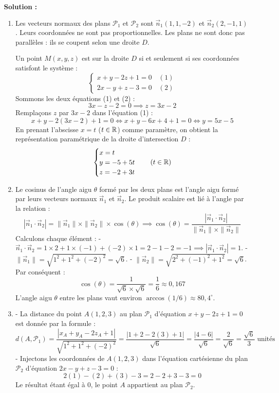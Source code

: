 \textbf{Solution :}
\begin{enumerate}
    \item Les vecteurs normaux des plans $\mathcal{P}_1$ et $\mathcal{P}_2$ sont $\vec{n}_1(1, 1, -2)$ et $\vec{n}_2(2, -1, 1)$.
    Leurs coordonnées ne sont pas proportionnelles. Les plans ne sont donc pas parallèles : ils se coupent selon une droite $D$.
    
    Un point $M(x,y,z)$ est sur la droite $D$ si et seulement si ses coordonnées satisfont le système :
    \[
    \begin{cases}
    x + y - 2z + 1 = 0 \quad (1) \\
    2x - y + z - 3 = 0 \quad (2)
    \end{cases}
    \]
    Sommons les deux équations (1) et (2) :
    \[
    3x - z - 2 = 0 \implies z = 3x - 2
    \]
    Remplaçons $z$ par $3x - 2$ dans l'équation (1) :
    \[
    x + y - 2(3x - 2) + 1 = 0 \iff x + y - 6x + 4 + 1 = 0 \iff y = 5x - 5
    \]
    En prenant l'abscisse $x = t$ ($t \in \mathbb{R}$) comme paramètre, on obtient la représentation paramétrique de la droite d'intersection $D$ :
    \[
    \begin{cases}
    x = t \\
    y = -5 + 5t \\
    z = -2 + 3t
    \end{cases} \quad (t \in \mathbb{R})
    \]
    
    \item Le cosinus de l'angle aigu $\theta$ formé par les deux plans est l'angle aigu formé par leurs vecteurs normaux $\vec{n}_1$ et $\vec{n}_2$. Le produit scalaire est lié à l'angle par la relation :
    \[
    |\vec{n}_1 \cdot \vec{n}_2| = \|\vec{n}_1\| \times \|\vec{n}_2\| \times \cos(\theta) \implies \cos(\theta) = \frac{|\vec{n}_1 \cdot \vec{n}_2|}{\|\vec{n}_1\| \times \|\vec{n}_2\|}
    \]
    Calculons chaque élément :
    - $\vec{n}_1 \cdot \vec{n}_2 = 1 \times 2 + 1 \times (-1) + (-2) \times 1 = 2 - 1 - 2 = -1 \implies |\vec{n}_1 \cdot \vec{n}_2| = 1$.
    - $\|\vec{n}_1\| = \sqrt{1^2 + 1^2 + (-2)^2} = \sqrt{6}$.
    - $\|\vec{n}_2\| = \sqrt{2^2 + (-1)^2 + 1^2} = \sqrt{6}$.
    Par conséquent :
    \[
    \cos(\theta) = \frac{1}{\sqrt{6} \times \sqrt{6}} = \frac{1}{6} \approx 0,167
    \]
    L'angle aigu $\theta$ entre les plans vaut environ $\arccos(1/6) \approx 80,4^\circ$.
    
    \item - La distance du point $A(1, 2, 3)$ au plan $\mathcal{P}_1$ d'équation $x + y - 2z + 1 = 0$ est donnée par la formule :
    \[
    d(A, \mathcal{P}_1) = \frac{|x_A + y_A - 2z_A + 1|}{\sqrt{1^2 + 1^2 + (-2)^2}} = \frac{|1 + 2 - 2(3) + 1|}{\sqrt{6}} = \frac{|4 - 6|}{\sqrt{6}} = \frac{2}{\sqrt{6}} = \frac{\sqrt{6}}{3} \text{ unités}
    \]
    - Injectons les coordonnées de $A(1, 2, 3)$ dans l'équation cartésienne du plan $\mathcal{P}_2$ d'équation $2x - y + z - 3 = 0$ :
    \[
    2(1) - (2) + (3) - 3 = 2 - 2 + 3 - 3 = 0
    \]
    Le résultat étant égal à 0, le point $A$ appartient au plan $\mathcal{P}_2$.
\end{enumerate}
